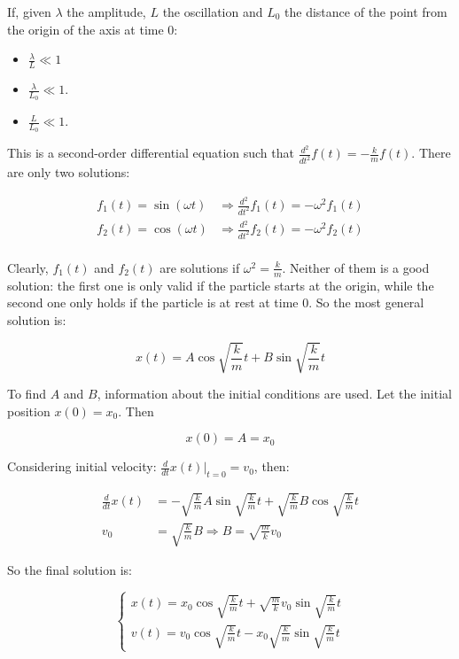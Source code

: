   If, given $\lambda$ the amplitude, $L$ the oscillation and $L_0$ the distance of the point from the origin of the axis at time $0$:

  \begin{multicols}{3}
    \begin{itemize}
      \item $\frac{\lambda}{L}\ll 1$
      \item $\frac{\lambda}{L_0}\ll 1$.
      \item $\frac{L}{L_0}\ll 1$.
    \end{itemize}
  \end{multicols}

  This is a second-order differential equation such that $\frac{d{^2}}{d{t^2}}f(t) = -\frac{k}{m}f(t)$.
  There are only two solutions:

  \begin{align*}
    f_1(t) = \sin(\omega t) &\Rightarrow \frac{d{^2}}{d{t^2}}f_1(t) = -\omega^2f_1(t)\\
    f_2(t) = \cos(\omega t) &\Rightarrow \frac{d{^2}}{d{t^2}}f_2(t) = -\omega^2f_2(t)\\
  \end{align*}

  Clearly, $f_1(t)$ and $f_2(t)$ are solutions if $\omega^2 = \frac{k}{m}$.
  Neither of them is a good solution: the first one is only valid if the particle starts at the origin, while the second one only holds if the particle is at rest at time $0$.
  So the most general solution is:

  $$x(t) = A\cos\sqrt{\frac{k}{m}}t+B\sin\sqrt{\frac{k}{m}}t$$

  To find $A$ and $B$, information about the initial conditions are used.
  Let the initial position $x(0) = x_0$.
  Then

  $$x(0) = A = x_0$$

  Considering initial velocity: $\frac{d{}}{d{t}}x(t)|_{t=0} = v_0$, then:

  \begin{align*}
    \frac{d{}}{d{t}}x(t) &= -\sqrt{\frac{k}{m}}A\sin\sqrt{\frac{k}{m}}t + \sqrt{\frac{k}{m}}B\cos\sqrt{\frac{k}{m}}t\\
    v_0 &= \sqrt{\frac{k}{m}} B \Rightarrow B = \sqrt{\frac{m}{k}}v_0
  \end{align*}

  So the final solution is:

  $$\begin{cases}
    x(t) = x_0\cos\sqrt{\frac{k}{m}}t+\sqrt{\frac{m}{k}}v_0\sin\sqrt{\frac{k}{m}}t\\
    v(t) = v_0\cos\sqrt{\frac{k}{m}} t -x_0\sqrt{\frac{k}{m}}\sin\sqrt{\frac{k}{m}} t
  \end{cases}$$

